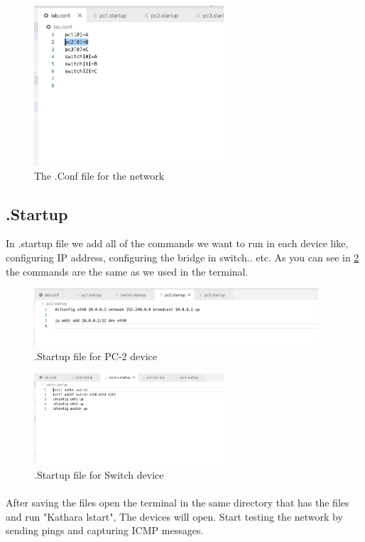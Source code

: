\begin{figure}[H]
\centering
  \includegraphics[width=200pt]{Images/config.png}
  \caption{The .Conf file for the network}
  \label{fig:3.12}
\end{figure}
 
\subsection{.Startup}
In .startup file we add all of the commands we want to run in each device like, configuring IP address, configuring the bridge in switch.. etc. As you can see in \ref{fig:3.13} the commands are the same as we used in the terminal.

\begin{figure}[H]
\centering
  \includegraphics[width=300pt]{Images/pc2Startup.png}
  \caption{.Startup file for  PC-2 device}
  \label{fig:3.13}
\end{figure}

\begin{figure}[H]
\centering
  \includegraphics[width=200pt]{Images/switchstartup.png}
  \caption{.Startup file for Switch device}
  \label{fig:3.14}
\end{figure}

\clearpage
\paragraph{} 
After saving the files open the terminal in the same directory that has the files and run "Kathara lstart", The devices will open. Start testing the network by sending pings and capturing ICMP messages.


